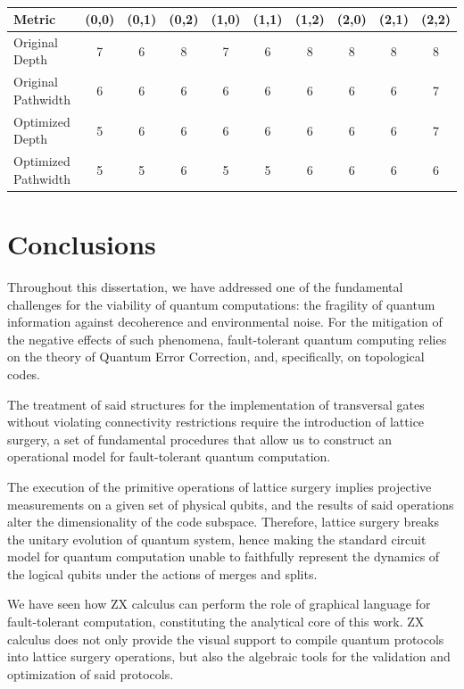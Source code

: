 \documentclass[12pt, twoside, openany]{book}
\begin{document}
\begin{table}[ht]
    \centering
    \caption{}
    \label{tab:optimization_data}
    \begin{tabular}{lccccccccc} 
        \toprule
        \textbf{Metric} & \textbf{(0,0)} & \textbf{(0,1)} & \textbf{(0,2)} & \textbf{(1,0)} & \textbf{(1,1)} & \textbf{(1,2)} & \textbf{(2,0)} & \textbf{(2,1)} & \textbf{(2,2)} \\
        \midrule
        Original Depth & 7  & 6  & 8  & 7  & 6  & 8  & 8  & 8  & 8  \\
        Original Pathwidth & 6 & 6 & 6 & 6 & 6 & 6 & 6 & 6 & 7 \\
        Optimized Depth & 5 & 6 & 6 & 6 & 6 & 6 & 6 & 6 & 7 \\
        Optimized Pathwidth & 5 & 5 & 6 & 5 & 5 & 6 & 6 & 6 & 6 \\
        \bottomrule
    \end{tabular}
\end{table}

\chapter{Conclusions}

Throughout this dissertation, we have addressed one of the fundamental challenges for the viability of quantum computations: the fragility of quantum information against decoherence and environmental noise. For the mitigation of the negative effects of such phenomena, fault-tolerant quantum computing relies on the theory of Quantum Error Correction, and, specifically, on topological codes. 

The treatment of said structures for the implementation of transversal gates without violating connectivity restrictions require the introduction of lattice surgery, a set of fundamental procedures that allow us to construct an operational model for fault-tolerant quantum computation.

The execution of the primitive operations of lattice surgery implies projective measurements on a given set of physical qubits, and the results of said operations alter the dimensionality of the code subspace. Therefore, lattice surgery breaks the unitary evolution of quantum system, hence making the standard circuit model for quantum computation unable to faithfully represent the dynamics of the logical qubits under the actions of merges and splits. 

We have seen how ZX calculus can perform the role of graphical language for fault-tolerant computation, constituting the analytical core of this work. ZX calculus does not only provide the visual support to compile quantum protocols into lattice surgery operations, but also the algebraic tools for the validation and optimization of said protocols.
\end{document}
